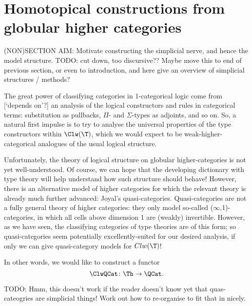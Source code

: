 

\chapter{Homotopical constructions from globular higher categories}


(NON)SECTION AIM: Motivate constructing the simplicial nerve, and hence the model structure.  TODO: cut down, too discursive??  Maybe move this to end of previous section, or even to introduction, and here give an overview of simplicial structures / methods?

\para %
The great power of classifying categories in 1-categorical logic come from [`depends on'?] an analysis of the logical constructors and rules in categorical terms: substitution as pullbacks, $\Pi$- and $\Sigma$-types as adjoints, and so on.  So, a natural first impulse is to try to analyse the universal properties of the type constructors within $\Clw(\T)$, which we would expect to be weak-higher-categorical analogues of the usual logical structure.

Unfortunately, the theory of logical structure on globular higher-categories is not yet well-understood.  Of course, we can hope that the developing dictionary with type theory will help understand how such structure should behave!  However, there is an alternative model of higher categories for which the relevant theory is already much further advanced: Joyal's quasi-categories.  Quasi-categories are not a fully general theory of higher categories: they only model so-called ($\infty$,1)-categories, in which all cells above dimension 1 are (weakly) invertible.  However, as we have seen, the classifying categories of type theories are of this form; so quasi-categories seem potentially excellently-suited for our desired analysis, if only we can give quasi-category models for $Clw(\T)$!

\para In other words, we would like to construct a functor
$$ \ClwQCat \colon \Th \to \QCat .$$

TODO: Hmm, this doesn't work if the reader doesn't know yet that quas-cateogries are simplicial things!  Work out how to re-organise to fit that in nicely.

